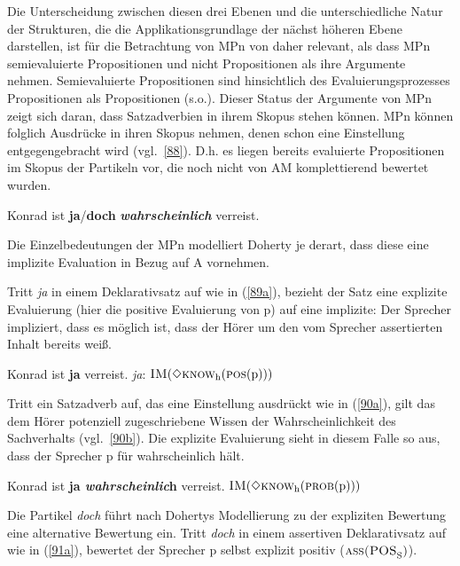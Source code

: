 Die Unterscheidung zwischen diesen drei Ebenen und die unterschiedliche Natur der Strukturen, die die Applikationsgrundlage der nächst höheren Ebene darstellen, ist für die Betrachtung von MPn von daher relevant, als dass MPn semievaluierte Propositionen und nicht  Propositionen als ihre Argumente nehmen. Semievaluierte Propositionen sind hinsichtlich des Evaluierungsprozes\-ses  Propositionen als  Propositionen (s.o.). Dieser Status der Argumente von MPn zeigt sich daran, dass Satzadverbien in ihrem Skopus stehen können. MPn können folglich Ausdrücke in ihren Skopus nehmen, denen schon eine Einstellung entgegengebracht wird (vgl.\ \ref{88}). D.h. es liegen bereits evaluierte Propositionen im Skopus der Partikeln vor, die noch nicht von AM komplettierend bewertet wurden.

\begin{exe}
	\ex\label{88} 
	Konrad ist \textbf{ja}/\textbf{doch} \textbf{\textit{wahrscheinlich}} verreist.
\end{exe}

Die Einzelbedeutungen der MPn modelliert Doherty je derart, dass diese eine implizite Evaluation in Bezug auf A vornehmen.

Tritt \textit{ja} in einem Deklarativsatz  auf wie in (\ref{89a}), bezieht der Satz eine explizite Evaluierung (hier die positive Evaluierung von p) auf eine implizite: Der Sprecher impliziert, dass es möglich ist, dass der Hörer um den vom Sprecher assertierten Inhalt bereits weiß.

\begin{exe}
	\ex\label{89} 
		\begin{xlist}	
			\ex\label{89a} Konrad ist \textbf{ja} verreist.	
			\ex\label{89b} \textit{ja}:	$\textrm{\textsc{IM}}(\Diamond \textrm{\textsc{know}}_{\textrm{h}}(\textrm{\textsc{pos}(p)}))$	
			\hfill\hbox{\citet[101]{Doherty1987}}
		\end{xlist}
\end{exe}
Tritt ein Satzadverb  auf, das eine Einstellung ausdrückt wie in (\ref{90a}), gilt das dem Hörer potenziell zugeschriebene Wissen der Wahrscheinlichkeit des Sachverhalts (vgl.\ \ref{90b}). Die explizite Evaluierung sieht in diesem Falle so aus, dass der Sprecher p für wahrscheinlich hält.

\begin{exe}
	\ex\label{90} 
		\begin{xlist}	
			\ex\label{90a} Konrad ist \textbf{ja \textit{wahrscheinlic}h} verreist.	
			\ex\label{90b} $\textrm{\textsc{IM}}(\Diamond \textrm{\textsc{know}}_{\textrm{h}}(\textrm{\textsc{prob}(p)}))$
			\hfill\hbox{\citet[101]{Doherty1987}}
		\end{xlist}
\end{exe}
Die Partikel \textit{doch} führt nach Dohertys Modellierung zu der expliziten Bewertung eine alternative Bewertung ein. Tritt \textit{doch} in einem assertiven Deklarativsatz  auf wie in (\ref{91a}), bewertet der Sprecher p selbst explizit positiv ($\textrm{\textsc{ass(POS}}_{\textrm{S}})$). 

